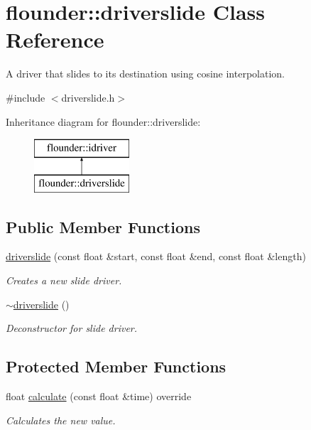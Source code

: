\hypertarget{classflounder_1_1driverslide}{}\section{flounder\+:\+:driverslide Class Reference}
\label{classflounder_1_1driverslide}


A driver that slides to its destination using cosine interpolation.  




{\ttfamily \#include $<$driverslide.\+h$>$}

Inheritance diagram for flounder\+:\+:driverslide\+:\begin{figure}[H]
\begin{center}
\leavevmode
\includegraphics[height=2.000000cm]{classflounder_1_1driverslide}
\end{center}
\end{figure}
\subsection*{Public Member Functions}
\begin{DoxyCompactItemize}
\item 
\hyperlink{classflounder_1_1driverslide_a9e4b295bdb0ce7254fb7c4d7313f8b22}{driverslide} (const float \&start, const float \&end, const float \&length)
\begin{DoxyCompactList}\small\item\em Creates a new slide driver. \end{DoxyCompactList}\item 
\hyperlink{classflounder_1_1driverslide_a7972fc7a317d190a2fbfe0a0b77773e8}{$\sim$driverslide} ()
\begin{DoxyCompactList}\small\item\em Deconstructor for slide driver. \end{DoxyCompactList}\end{DoxyCompactItemize}
\subsection*{Protected Member Functions}
\begin{DoxyCompactItemize}
\item 
float \hyperlink{classflounder_1_1driverslide_aecbe9478f7ea9b1a781413f9284643c6}{calculate} (const float \&time) override
\begin{DoxyCompactList}\small\item\em Calculates the new value. \end{DoxyCompactList}\end{DoxyCompactItemize}
